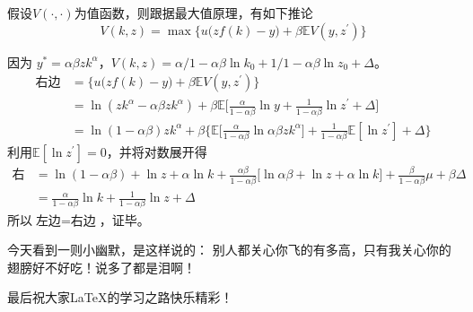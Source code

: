 \documentclass[cyan]{elegantnote}
\begin{document}
\lipsum[5-6]
\begin{newcorol}
假设$V(\cdot,\cdot)$为值函数，则跟据最大值原理，有如下推论
\[
V(k,z)=\max\Big\{u\big(zf(k)-y\big)+\beta \mathbb{E}V(y,z^\prime)\Big\}
\]
\end{newcorol}

\begin{newproof}
因为 $y^*=\alpha\beta z k^\alpha$，$V(k,z)=\alpha/1-\alpha\beta\ln k_0+1/1-\alpha\beta \ln z_0+\Delta$。
\begin{align*}
\text{右边}&=\Big\{u\big(zf(k)-y\big)+\beta \mathbb{E}V(y,z^\prime)\Big\}\\
&=\ln(zk^\alpha-\alpha\beta zk^\alpha)+\beta\mathbb{E}\Big[\frac{\alpha}{1-\alpha\beta}\ln y+\frac{1}{1-\alpha\beta}\ln z^\prime+\Delta\Big]\\
&=\ln(1-\alpha\beta)zk^\alpha+\beta\Big\{\mathbb{E}\big[\frac{\alpha}{1-\alpha\beta}\ln \alpha\beta z k^\alpha\big]+\frac{1}{1-\alpha\beta}\mathbb{E}[\ln z^\prime]+\Delta\Big\}
\end{align*}
利用$\mathbb{E}[\ln z^\prime]=0$，并将对数展开得
\begin{align*}
\text{右边}&=\ln (1-\alpha\beta)+\ln z+\alpha\ln k+\frac{\alpha\beta}{1-\alpha\beta}\big[\ln \alpha\beta+\ln z+\alpha\ln k\big]+\frac{\beta}{1-\alpha\beta}\mu+\beta \Delta\\
&=\frac{\alpha}{1-\alpha\beta}\ln k+\frac{1}{1-\alpha\beta}\ln z+\Delta
\end{align*}
所以$\text{左边}=\text{右边}$，证毕。
\end{newproof}




\begin{conclusion}
今天看到一则小幽默，是这样说的：{\color{thid} 别人都关心你飞的有多高，只有我关心你的翅膀好不好吃！}说多了都是泪啊！
\end{conclusion}

最后祝大家\LaTeX{}的学习之路快乐精彩！
\end{document}

